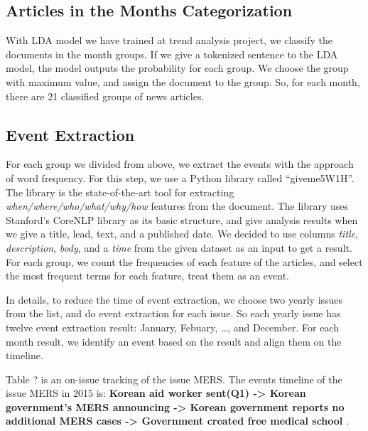 \subsection{Articles in the Months Categorization}

With LDA model we have trained at trend analysis project,
we classify the documents in the month groups.
If we give a tokenized sentence to the LDA model,
the model outputs the probability for each group.
We choose the group with maximum value, and assign the document to the group.
So, for each month, there are 21 classified groups of news articles.

\subsection{Event Extraction}

For each group we divided from above,
we extract the events with the approach of word frequency.
For this step, we use a Python library called ``giveme5W1H''.
The library is the state-of-the-art tool for extracting
\textit{when/where/who/what/why/how} features from the document.
The library uses Stanford's CoreNLP library as its basic structure,
and give analysis results when we give a
title, lead, text, and a published date.
We decided to use columns \textit{title}, \textit{description}, \textit{body}, and a \textit{time}
from the given dataset as an input to get a result.
For each group, we count the frequencies of each feature of the articles,
and select the most frequent terms for each feature, treat them as an event.

In details, to reduce the time of event extraction,
we choose two yearly issues from the list, and do event extraction for each issue.
So each yearly issue has twelve event extraction result: January, Febuary, \dots, and December.
For each month result, we identify an event based on the result and align them on the timeline.

Table ? is an on-issue tracking of the issue MERS.
The events timeline of the issue MERS in 2015 is: 
\textbf{
Korean aid worker sent(Q1) ->
Korean government's MERS announcing ->
Korean government reports no additional MERS cases ->
Government created free medical school
}.

